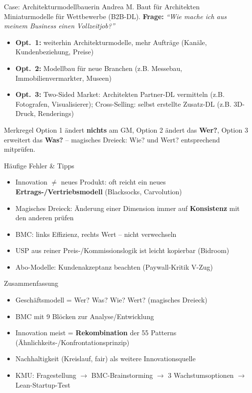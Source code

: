 \documentclass[a4paper, fontsize=7pt]{scrartcl}
\begin{document}
\begin{subbox}{Case: Architekturmodellbauerin Andrea M.}
Baut für Architekten Miniaturmodelle für Wettbewerbe (B2B-DL).
\textbf{Frage:} \emph{``Wie mache ich aus meinem Business einen
Vollzeitjob?''}
\begin{itemize}
    \item \textbf{Opt.\ 1:} weiterhin Architekturmodelle, mehr Aufträge
    (Kanäle, Kundenbeziehung, Preise)
    \item \textbf{Opt.\ 2:} Modellbau für neue Branchen (z.B. Messebau,
    Immobilienvermarkter, Museen)
    \item \textbf{Opt.\ 3:} Two-Sided Market: Architekten Partner-DL
    vermitteln (z.B. Fotografen, Visualisierer); Cross-Selling:
    selbst erstellte Zusatz-DL (z.B. 3D-Druck, Renderings)
\end{itemize}
\end{subbox}

\begin{subbox}{Merkregel}
Option 1 ändert \textbf{nichts} am GM, Option 2 ändert das \textbf{Wer?},
Option 3 erweitert das \textbf{Was?} -- magisches Dreieck: Wie? und Wert?
entsprechend mitprüfen.
\end{subbox}

\begin{subbox}{Häufige Fehler \& Tipps}
\begin{itemize}
    \item Innovation $\neq$ neues Produkt: oft reicht ein neues
    \textbf{Ertrags-/Vertriebsmodell} (Blacksocks, Carvolution)
    \item Magisches Dreieck: Änderung einer Dimension immer auf
    \textbf{Konsistenz} mit den anderen prüfen
    \item BMC: links Effizienz, rechts Wert -- nicht verwechseln
    \item USP aus reiner Preis-/Kommissionslogik ist leicht kopierbar
    (Bidroom)
    \item Abo-Modelle: Kundenakzeptanz beachten (Paywall-Kritik V-Zug)
\end{itemize}
\end{subbox}

\begin{subbox}{Zusammenfassung}
\begin{itemize}
    \item Geschäftsmodell = Wer? Was? Wie? Wert? (magisches Dreieck)
    \item BMC mit 9 Blöcken zur Analyse/Entwicklung
    \item Innovation meist = \textbf{Rekombination} der 55 Patterns
    (Ähnlichkeits-/Konfrontationsprinzip)
    \item Nachhaltigkeit (Kreislauf, fair) als weitere Innovationsquelle
    \item KMU: Fragestellung $\to$ BMC-Brainstorming $\to$ 3
    Wachstumsoptionen $\to$ Lean-Startup-Test
\end{itemize}
\end{subbox}
\end{document}
